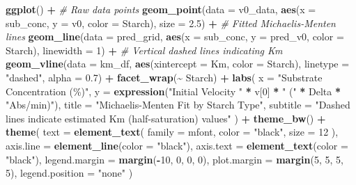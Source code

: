 \documentclass[
  12pt,
]{article}
\newenvironment{Shaded}{\begin{snugshade}}{\end{snugshade}}
\newcommand{\AttributeTok}[1]{\textcolor[rgb]{0.13,0.29,0.53}{#1}}
\newcommand{\CommentTok}[1]{\textcolor[rgb]{0.56,0.35,0.01}{\textit{#1}}}
\newcommand{\DecValTok}[1]{\textcolor[rgb]{0.00,0.00,0.81}{#1}}
\newcommand{\FloatTok}[1]{\textcolor[rgb]{0.00,0.00,0.81}{#1}}
\newcommand{\FunctionTok}[1]{\textcolor[rgb]{0.13,0.29,0.53}{\textbf{#1}}}
\newcommand{\NormalTok}[1]{#1}
\newcommand{\SpecialCharTok}[1]{\textcolor[rgb]{0.81,0.36,0.00}{\textbf{#1}}}
\newcommand{\StringTok}[1]{\textcolor[rgb]{0.31,0.60,0.02}{#1}}
\newcounter{none} %
\begin{document}
\begin{Shaded}
\begin{Highlighting}[]
\FunctionTok{ggplot}\NormalTok{() }\SpecialCharTok{+}
  \CommentTok{\# Raw data points}
  \FunctionTok{geom\_point}\NormalTok{(}\AttributeTok{data =}\NormalTok{ v0\_data, }\FunctionTok{aes}\NormalTok{(}\AttributeTok{x =}\NormalTok{ sub\_conc, }\AttributeTok{y =}\NormalTok{ v0, }
                                 \AttributeTok{color =}\NormalTok{ Starch), }\AttributeTok{size =} \FloatTok{2.5}\NormalTok{) }\SpecialCharTok{+}
  \CommentTok{\# Fitted Michaelis{-}Menten lines}
  \FunctionTok{geom\_line}\NormalTok{(}\AttributeTok{data =}\NormalTok{ pred\_grid, }\FunctionTok{aes}\NormalTok{(}\AttributeTok{x =}\NormalTok{ sub\_conc, }\AttributeTok{y =}\NormalTok{ pred\_v0, }
                                  \AttributeTok{color =}\NormalTok{ Starch), }
            \AttributeTok{linewidth =} \DecValTok{1}\NormalTok{) }\SpecialCharTok{+}
  \CommentTok{\# Vertical dashed lines indicating Km}
  \FunctionTok{geom\_vline}\NormalTok{(}\AttributeTok{data =}\NormalTok{ km\_df, }\FunctionTok{aes}\NormalTok{(}\AttributeTok{xintercept =}\NormalTok{ Km, }\AttributeTok{color =}\NormalTok{ Starch), }
             \AttributeTok{linetype =} \StringTok{"dashed"}\NormalTok{, }\AttributeTok{alpha =} \FloatTok{0.7}\NormalTok{) }\SpecialCharTok{+}
  \FunctionTok{facet\_wrap}\NormalTok{(}\SpecialCharTok{\textasciitilde{}}\NormalTok{ Starch) }\SpecialCharTok{+}
  \FunctionTok{labs}\NormalTok{(}
    \AttributeTok{x =} \StringTok{"Substrate Concentration (\%)"}\NormalTok{,}
    \AttributeTok{y =} \FunctionTok{expression}\NormalTok{(}\StringTok{"Initial Velocity "} \SpecialCharTok{*}\NormalTok{ v[}\DecValTok{0}\NormalTok{] }\SpecialCharTok{*} \StringTok{" ("} \SpecialCharTok{*}\NormalTok{ Delta }\SpecialCharTok{*} \StringTok{"Abs/min)"}\NormalTok{),}
    \AttributeTok{title =} \StringTok{"Michaelis{-}Menten Fit by Starch Type"}\NormalTok{,}
    \AttributeTok{subtitle =} \StringTok{"Dashed lines indicate estimated Km (half{-}saturation) values"}
\NormalTok{  ) }\SpecialCharTok{+}
  \FunctionTok{theme\_bw}\NormalTok{() }\SpecialCharTok{+}
  \FunctionTok{theme}\NormalTok{(}
    \AttributeTok{text =} \FunctionTok{element\_text}\NormalTok{(}
      \AttributeTok{family =}\NormalTok{ mfont,}
      \AttributeTok{color =} \StringTok{"black"}\NormalTok{,}
      \AttributeTok{size =} \DecValTok{12}
\NormalTok{    ),}
    \AttributeTok{axis.line =} \FunctionTok{element\_line}\NormalTok{(}\AttributeTok{color =} \StringTok{"black"}\NormalTok{),}
    \AttributeTok{axis.text =} \FunctionTok{element\_text}\NormalTok{(}\AttributeTok{color =} \StringTok{"black"}\NormalTok{),}
    \AttributeTok{legend.margin =} \FunctionTok{margin}\NormalTok{(}\SpecialCharTok{{-}}\DecValTok{10}\NormalTok{, }\DecValTok{0}\NormalTok{, }\DecValTok{0}\NormalTok{, }\DecValTok{0}\NormalTok{),}
    \AttributeTok{plot.margin =} \FunctionTok{margin}\NormalTok{(}\DecValTok{5}\NormalTok{, }\DecValTok{5}\NormalTok{, }\DecValTok{5}\NormalTok{, }\DecValTok{5}\NormalTok{),}
    \AttributeTok{legend.position =} \StringTok{"none"}
\NormalTok{    )}
\end{Highlighting}
\end{Shaded}
\end{document}
